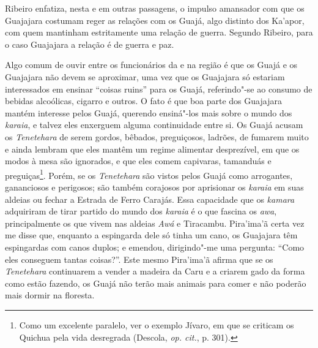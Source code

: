 Ribeiro enfatiza, nesta e em outras passagens, o impulso amansador com
que os Guajajara costumam reger as relações com os Guajá, algo distinto
dos Ka'apor, com quem mantinham estritamente uma relação de guerra.
Segundo Ribeiro, para o caso Guajajara a relação é de guerra e paz.

Algo comum de ouvir entre os funcionários da  e  na região é
que os Guajá e os Guajajara não devem se aproximar, uma vez que os
Guajajara só estariam interessados em ensinar ``coisas ruins'' para os
Guajá, referindo"-se ao consumo de bebidas alcoólicas, cigarro e outros.
O fato é que boa parte dos Guajajara mantém interesse pelos Guajá,
querendo ensiná"-los mais sobre o mundo dos \emph{karaia}, e talvez eles
enxerguem alguma continuidade entre si. Os Guajá acusam os
\emph{Tenetehara} de serem gordos, bêbados, preguiçosos, ladrões, de
fumarem muito e ainda lembram que eles mantêm um regime alimentar
desprezível, em que os modos à mesa são ignorados, e que eles comem
capivaras, tamanduás e preguiças\footnote{Como um excelente paralelo,
  ver o exemplo Jívaro, em que se criticam os Quichua pela vida
  desregrada (Descola, \emph{op. cit.}, p. 301).}. Porém, se os
\emph{Tenetehara} são vistos pelos Guajá como arrogantes, gananciosos e
perigosos; são também corajosos por aprisionar os \emph{karaia} em suas
aldeias ou fechar a Estrada de Ferro Carajás. Essa capacidade que os
\emph{kamara} adquiriram de tirar partido do mundo dos \emph{karaia} é o
que fascina os \emph{awa}, principalmente os que vivem nas aldeias
\emph{Awá} e Tiracambu. Pira'ima'ã certa vez me disse que, enquanto a
espingarda dele só tinha um cano, os Guajajara têm espingardas com canos
duplos; e emendou, dirigindo"-me uma pergunta: ``Como eles conseguem
tantas coisas?''. Este mesmo Pira'ima'ã afirma que se os
\emph{Tenetehara} continuarem a vender a madeira da  Caru e a criarem
gado da forma como estão fazendo, os Guajá não terão mais animais para
comer e não poderão mais dormir na floresta.

